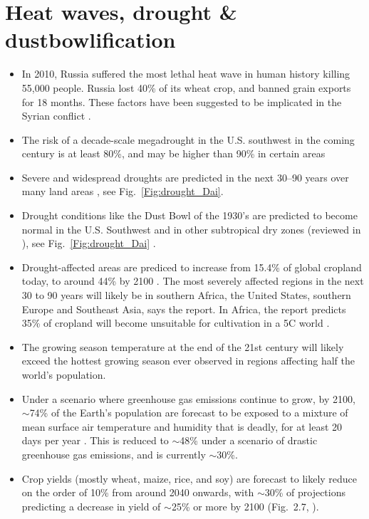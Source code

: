 \documentclass[11pt]{article}
\begin{document}
\section{Heat waves, drought \& dustbowlification}
\begin{itemize}
\item In 2010, Russia suffered the most lethal heat wave in human history killing 55,000 people. Russia lost 40\% of its wheat crop, and banned grain exports for 18 months. These factors have been suggested to be implicated in the Syrian conflict \cite{Kelley15}.
\item The risk of a decade-scale megadrought in the U.S. southwest in the coming century is at least 80\%, and may be higher than 90\% in certain areas \cite{Ault14}
\item Severe and widespread droughts are predicted in the next 30--90 years over many land areas \cite{Dai13}, see Fig.~\ref{Fig:drought_Dai}. 
\item Drought conditions like the Dust Bowl of the 1930's are predicted to become normal in the U.S. Southwest and in other subtropical dry zones (reviewed in \cite{Seager07,Ault14}), see Fig.~\ref{Fig:drought_Dai} \cite{Dai13}.
\item Drought-affected areas are prediced to increase from 15.4\% of global cropland today, to around 44\% by 2100 \cite{Li09}.  The most severely affected regions in the next 30 to 90 years will likely be in southern Africa, the United States, southern Europe and Southeast Asia, says the report. In Africa, the report predicts 35\% of cropland will become unsuitable for cultivation in a 5\textdegree{}C world \cite{WB12}.
\item The growing season temperature at the end of the 21st century will likely exceed the hottest growing season ever observed in regions affecting half the world's population\cite{Battisti09}. 
\item Under a scenario where greenhouse gas emissions continue to grow, by 2100, $\sim$74\% of the Earth's population are forecast to be exposed to a mixture of mean surface air temperature and humidity that is deadly, for at least 20 days per year \cite{Mora17}. This is reduced to $\sim$48\% under a scenario of drastic greenhouse gas emissions, and is currently  $\sim$30\%.
\item Crop yields (mostly wheat, maize, rice, and soy) are forecast to likely reduce on the order of 10\% from around 2040 onwards, with $\sim$30\% of projections predicting a decrease in yield of $\sim$25\% or more by 2100 (Fig.~2.7, \cite{Allen14}). 
\end{itemize}
\end{document}

